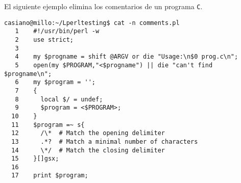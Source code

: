 El siguiente ejemplo elimina los comentarios de un programa \verb|C|.
\begin{latexonly}
\begin{verbatim}
casiano@millo:~/Lperltesting$ cat -n comments.pl
   1    #!/usr/bin/perl -w
   2    use strict;
   3  
   4    my $progname = shift @ARGV or die "Usage:\n$0 prog.c\n";
   5    open(my $PROGRAM,"<$progname") || die "can't find $progname\n";
   6    my $program = '';
   7    {
   8      local $/ = undef;
   9      $program = <$PROGRAM>;
  10    }
  11    $program =~ s{
  12      /\*  # Match the opening delimiter
  13      .*?  # Match a minimal number of characters
  14      \*/  # Match the closing delimiter
  15    }[]gsx;
  16  
  17    print $program;
\end{verbatim}
\end{latexonly}
